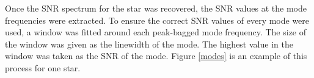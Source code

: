 \documentclass[a4paper,fleqn,usenatbib,useAMS]{mnras}
\begin{document}

Once the SNR spectrum for the star was recovered, the SNR values at the mode frequencies were extracted. To ensure the correct SNR values of every mode were used, a window was fitted around each peak-bagged mode frequency. The size of the window was given as the linewidth of the mode. The highest value in the window was taken as the SNR of the mode. Figure \ref{modes} is an example of this process for one star. 
\end{document}

